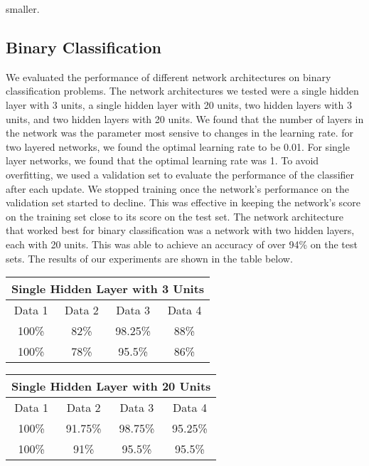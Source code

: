 \documentclass[10pt,twoside]{article}
\begin{document}
\noindent smaller.

\subsection{Binary Classification}

We evaluated the performance of different network architectures on binary classification problems. The network architectures we tested were a single hidden layer with 3 units, a single hidden layer with 20 units, two hidden layers with 3 units, and two hidden layers with 20 units. We found that the number of layers in the network was the parameter most sensive to changes in the learning rate. for two layered networks, we found the optimal learning rate to be 0.01. For single layer networks, 
we found that the optimal learning rate was 1. To avoid overfitting, we used a validation set to evaluate the performance of the classifier after each update. We stopped training once the network's performance on the validation set started to decline. This was effective in keeping the network's score on the training set close to its score on the test set. The network architecture that worked best for binary classification was a network with two hidden layers, each with 20 units. This was able to achieve an accuracy of over 94\% on the test sets. The results of our experiments are shown in the table below. 

\begin{center}
 \begin{tabular}{||c c c c||} 
 \hline
 \multicolumn{4}{|c|}{Single Hidden Layer with 3 Units} \\
 \hline
 \hline
 Data 1 & Data 2 & Data 3 & Data 4 \\ [0.5ex] 
  \hline
 100\% & 82\% & 98.25\% & 88\% \\
 \hline\hline
 100\% & 78\% & 95.5\% & 86\% \\ 

 \hline
\end{tabular}
\end{center}

\begin{center}
 \begin{tabular}{||c c c c||} 
 \hline
 \multicolumn{4}{|c|}{Single Hidden Layer with 20 Units} \\
 \hline
 \hline
 Data 1 & Data 2 & Data 3 & Data 4 \\ [0.5ex] 
  \hline
 100\% & 91.75\% & 98.75\% & 95.25\% \\
 \hline\hline
 100\% & 91\% & 95.5\% & 95.5\% \\ 

 \hline
\end{tabular}
\end{center}
\end{document}
